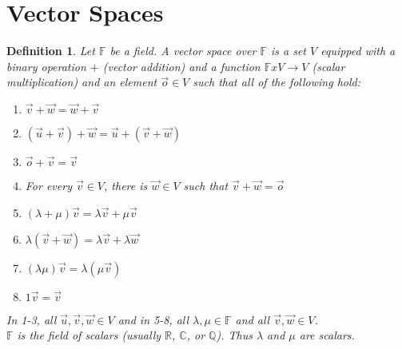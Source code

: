 \documentclass{report}
\newtheorem*{defn}{Definition}
\begin{document}
\section{Vector Spaces}
\begin{defn}
	Let $\mathbb{F}$ be a field. A vector space over $\mathbb{F}$ is a set $V$ equipped with a binary operation $+$ (vector addition) and a function $\mathbb{F} x V \rightarrow V$ (scalar multiplication) and an element $\vec{o} \in V$ such that all of the following hold:
	\begin{enumerate}
	\item $\vec{v} + \vec{w} = \vec{w} + \vec{v}$
	\item $(\vec{u} + \vec{v}) + \vec{w} = \vec{u} + (\vec{v} + \vec{w})$
	\item $\vec{o} + \vec{v} = \vec{v}$
	\item For every $\vec{v} \in V$, there is $\vec{w} \in V$ such that $\vec{v} + \vec{w} = \vec{o}$
	\item $(\lambda + \mu)\vec{v} = \lambda \vec{v} + \mu \vec{v}$
	\item $\lambda (\vec{v} + \vec{w}) = \lambda \vec{v} + \lambda \vec{w}$
	\item $(\lambda \mu) \vec{v} = \lambda(\mu \vec{v})$
	\item $1\vec{v} = \vec{v}$
	\end{enumerate}
	In 1-3, all $\vec{u}, \vec{v}, \vec{w} \in V$ and in 5-8, all $\lambda, \mu \in \mathbb{F}$ and all $\vec{v}, \vec{w} \in V$.\\
	$\mathbb{F}$ is the field of scalars (usually $\mathbb{R}$, $\mathbb{C}$, or $\mathbb{Q}$). Thus $\lambda$ and $\mu$ are scalars.
\end{defn}
\end{document}
